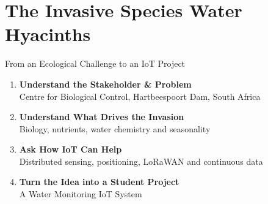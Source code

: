 \part{The Invasive Species Water Hyacinths}

\begin{frame}{From an Ecological Challenge to an IoT Project}
\begin{enumerate}
    \item \textbf{Understand the Stakeholder \& Problem}\\
          Centre for Biological Control, Hartbeespoort Dam, South Africa
    \item \textbf{Understand What Drives the Invasion}\\
          Biology, nutrients, water chemistry and seasonality
    \item \textbf{Ask How IoT Can Help}\\
          Distributed sensing, positioning, LoRaWAN and continuous data
    \item \textbf{Turn the Idea into a Student Project}\\
          A Water Monitoring IoT System
\end{enumerate}
\end{frame}
